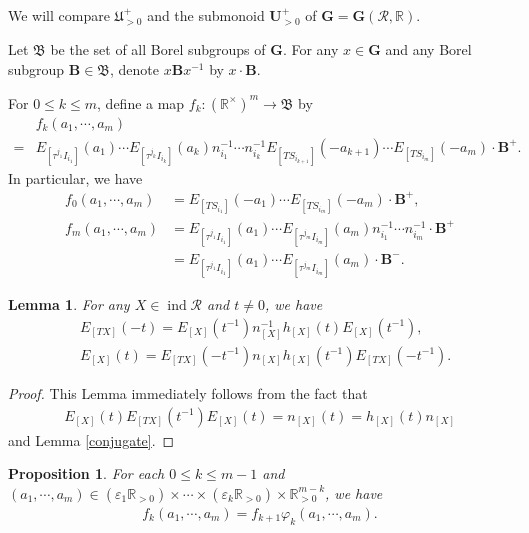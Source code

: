 \documentclass[12pt]{amsart}
\newtheorem{lemma}[theorem]{Lemma}
\newtheorem{proposition}[theorem]{Proposition}
\begin{document}
We will compare $\mathfrak{U}^+_{>0}$ and the submonoid $\mathbf{U}^+_{>0}$ of $\mathbf{G}=\mathbf{G}(\mathcal{R},\mathbb{R})$.

Let $\mathfrak{B}$ be the set of all Borel subgroups of $\mathbf{G}$.
For any $x\in \mathbf{G}$ and any Borel subgroup $\mathbf{B}\in \mathfrak{B}$, denote $x\mathbf{B}x^{-1}$ by $x\cdot \mathbf{B}$.

For $0\leq k\leq m$, define a map $f_k:(\mathbb{R}^{\times})^m \rightarrow \mathfrak{B}$ by 
\begin{align*}
    &f_k(a_1,\cdots,a_m)\\
    =&E_{[\tau^{j_1}I_{i_1}]}(a_1) \cdots E_{[\tau^{j_k}I_{i_k}]}(a_k) n_{i_1}^{-1}\cdots n_{i_k}^{-1}E_{[TS_{i_{k+1}}]}(-a_{k+1}) \cdots E_{[TS_{i_m}]}(-a_m) \cdot \mathbf{B}^+.
\end{align*}
In particular, we have 
\begin{align*}
    f_0(a_1,\cdots,a_m)&=E_{[TS_{i_1}]}(-a_1)\cdots E_{[TS_{i_m}]}(-a_m)\cdot \mathbf{B}^+,\\
    f_m(a_1,\cdots,a_m)&=E_{[\tau^{j_1}I_{i_1}]}(a_1) \cdots E_{[\tau^{j_m}I_{i_m}]}(a_m) n_{i_1}^{-1}\cdots n_{i_m}^{-1} \cdot \mathbf{B}^+\\
    &=E_{[\tau^{j_1}I_{i_1}]}(a_1) \cdots E_{[\tau^{j_m}I_{i_m}]}(a_m)  \cdot \mathbf{B}^-.
\end{align*}

\begin{lemma}
    For any $X\in \operatorname{ind}\mathcal{R}$ and $t\neq 0$, we have 
    \begin{align*}
        &E_{[TX]}(-t)=E_{[X]}(t^{-1})n_{[X]}^{-1}h_{[X]}(t)E_{[X]}(t^{-1}),\\
        &E_{[X]}(t)=E_{[TX]}(-t^{-1}) n_{[X]} h_{[X]}(t^{-1})E_{[TX]}(-t^{-1}).
    \end{align*}
\end{lemma}

\begin{proof}
    This Lemma immediately follows from the fact that 
    \begin{align*}
        E_{[X]}(t)E_{[TX]}(t^{-1})E_{[X]}(t)=n_{[X]}(t)=h_{[X]}(t)n_{[X]}
    \end{align*}
    and Lemma \ref{conjugate}.
\end{proof}



\begin{proposition}\label{fk}
   For each $0\leq k\leq m-1$ and $(a_1,\cdots,a_m)\in (\varepsilon_1\mathbb{R}_{>0})\times \cdots \times (\varepsilon_k\mathbb{R}_{>0})\times \mathbb{R}_{>0}^{m-k}$, we have 
    \begin{align*}
        f_k(a_1,\cdots,a_m)=f_{k+1}\varphi_k(a_1,\cdots,a_m).
    \end{align*}
\end{proposition}
\end{document}
